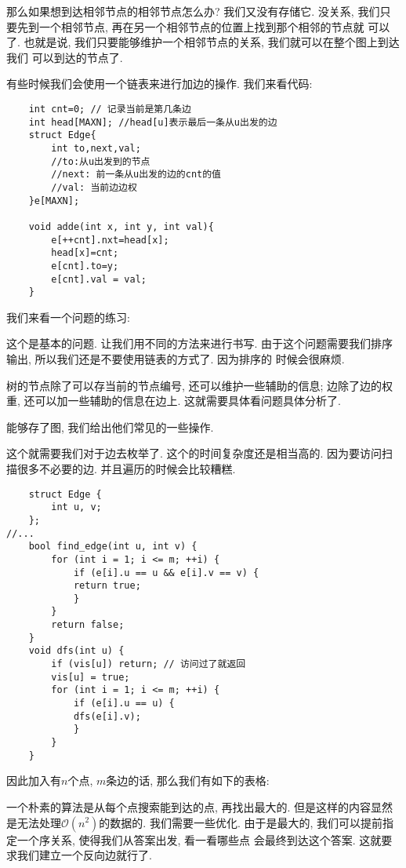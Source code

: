 那么如果想到达相邻节点的相邻节点怎么办? 我们又没有存储它.
没关系, 我们只要先到一个相邻节点, 再在另一个相邻节点的位置上找到那个相邻的节点就
可以了. 也就是说, 我们只要能够维护一个相邻节点的关系, 我们就可以在整个图上到达我们
可以到达的节点了. 

 有些时候我们会使用一个链表来进行加边的操作. 
我们来看代码: 

\begin{lstlisting}
    int cnt=0; // 记录当前是第几条边
    int head[MAXN]; //head[u]表示最后一条从u出发的边
    struct Edge{
        int to,next,val;
        //to:从u出发到的节点
	    //next: 前一条从u出发的边的cnt的值
	    //val: 当前边边权
    }e[MAXN];

    void adde(int x, int y, int val){
        e[++cnt].nxt=head[x];
        head[x]=cnt;
        e[cnt].to=y;
        e[cnt].val = val;
    }   
\end{lstlisting}

我们来看一个问题的练习: 

 这个是基本的问题. 让我们用不同的方法来进行书写. 
由于这个问题需要我们排序输出, 所以我们还是不要使用链表的方式了. 因为排序的
时候会很麻烦. 

树的节点除了可以存当前的节点编号, 还可以维护一些辅助的信息; 边除了边的权重, 
还可以加一些辅助的信息在边上. 这就需要具体看问题具体分析了. 

能够存了图, 我们给出他们常见的一些操作. 

 这个就需要我们对于边去枚举了. 这个的时间复杂度还是相当高的. 因为要访问扫描很多不必要的边. 并且遍历的时候会比较糟糕.
\begin{lstlisting}
    struct Edge {
        int u, v;
    };
//...
    bool find_edge(int u, int v) {
        for (int i = 1; i <= m; ++i) {
            if (e[i].u == u && e[i].v == v) {
            return true;
            }
        }
        return false;
    }
    void dfs(int u) {
        if (vis[u]) return; // 访问过了就返回
        vis[u] = true;
        for (int i = 1; i <= m; ++i) {
            if (e[i].u == u) {
            dfs(e[i].v);
            }
        }
    }
\end{lstlisting}

因此加入有$n$个点, $m$条边的话, 那么我们有如下的表格: 



 一个朴素的算法是从每个点搜索能到达的点, 再找出最大的.
但是这样的内容显然是无法处理$\mathcal O(n^2)$的数据的. 我们需要一些优化. 
由于是最大的, 我们可以提前指定一个序关系, 使得我们从答案出发, 看一看哪些点
会最终到达这个答案. 这就要求我们建立一个反向边就行了. 

